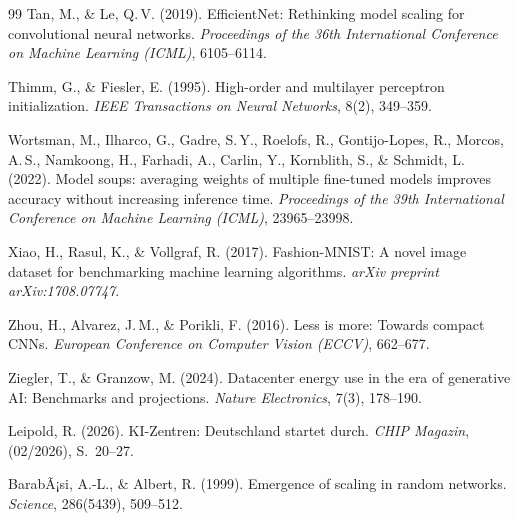 ﻿\documentclass[12pt, a4paper, openany]{report}
\begin{document}
\begin{thebibliography}{99}
Tan, M., \& Le, Q.\,V. (2019).
EfficientNet: Rethinking model scaling for convolutional neural networks.
\textit{Proceedings of the 36th International Conference on Machine
Learning (ICML)}, 6105--6114.

Thimm, G., \& Fiesler, E. (1995).
High-order and multilayer perceptron initialization.
\textit{IEEE Transactions on Neural Networks}, 8(2), 349--359.

Wortsman, M., Ilharco, G., Gadre, S.\,Y., Roelofs, R., Gontijo-Lopes, R.,
Morcos, A.\,S., Namkoong, H., Farhadi, A., Carlin, Y., Kornblith, S.,
\& Schmidt, L. (2022).
Model soups: averaging weights of multiple fine-tuned models improves
accuracy without increasing inference time.
\textit{Proceedings of the 39th International Conference on Machine
Learning (ICML)}, 23965--23998.

Xiao, H., Rasul, K., \& Vollgraf, R. (2017).
Fashion-MNIST: A novel image dataset for benchmarking machine learning
algorithms.
\textit{arXiv preprint arXiv:1708.07747}.

Zhou, H., Alvarez, J.\,M., \& Porikli, F. (2016).
Less is more: Towards compact CNNs.
\textit{European Conference on Computer Vision (ECCV)}, 662--677.

Ziegler, T., \& Granzow, M. (2024).
Datacenter energy use in the era of generative AI: Benchmarks and
projections.
\textit{Nature Electronics}, 7(3), 178--190.

Leipold, R. (2026).
KI-Zentren: Deutschland startet durch.
\textit{CHIP Magazin}, (02/2026), S.~20--27.

BarabÃ¡si, A.-L., \& Albert, R. (1999).
Emergence of scaling in random networks.
\textit{Science}, 286(5439), 509--512.

\end{thebibliography}
\end{document}
